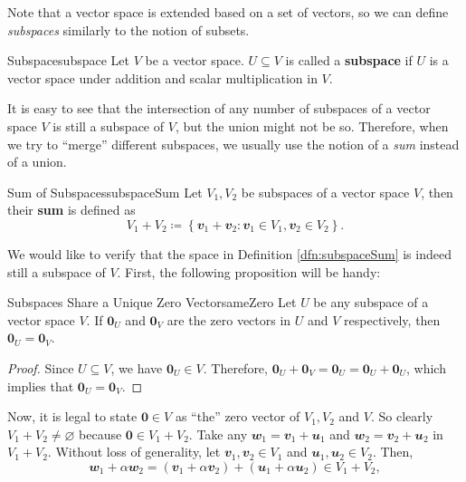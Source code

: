 \documentclass[math]{amznotes}
\theoremstyle{remark}
\newcommand{\zero}{\mathbf{0}}
\begin{document}
Note that a vector space is extended based on a set of vectors, so we can define \textit{subspaces} similarly to the notion of subsets.
\begin{dfnbox}{Subspace}{subspace}
    Let $V$ be a vector space. $U \subseteq V$ is called a {\color{red} \textbf{subspace}} if $U$ is a vector space under addition and scalar multiplication in $V$.
\end{dfnbox}
It is easy to see that the intersection of any number of subspaces of a vector space $V$ is still a subspace of $V$, but the union might not be so. Therefore, when we try to ``merge'' different subspaces, we usually use the notion of a \textit{sum} instead of a union. 
\begin{dfnbox}{Sum of Subspaces}{subspaceSum}
    Let $V_1, V_2$ be subspaces of a vector space $V$, then their {\color{red} \textbf{sum}} is defined as 
    \begin{equation*}
        V_1 + V_2 \coloneqq \left\{\mathbfit{v}_1 + \mathbfit{v}_2 \colon \mathbfit{v}_1 \in V_1, \mathbfit{v}_2 \in V_2\right\}.
    \end{equation*}
\end{dfnbox}
We would like to verify that the space in Definition \ref{dfn:subspaceSum} is indeed still a subspace of $V$. First, the following proposition will be handy:
\begin{probox}{Subspaces Share a Unique Zero Vector}{sameZero}
    Let $U$ be any subspace of a vector space $V$. If $\zero_U$ and $\zero_V$ are the zero vectors in $U$ and $V$ respectively, then $\zero_U = \zero_V$.
    \tcblower
    \begin{proof}
        Since $U \subseteq V$, we have $\zero_U \in V$. Therefore, $\zero_U + \zero_V = \zero_U = \zero_U + \zero_U$, which implies that $\zero_U = \zero_V$.
    \end{proof}
\end{probox} 
Now, it is legal to state $\zero \in V$ as ``the'' zero vector of $V_1, V_2$ and $V$. So clearly $V_1 + V_2 \neq \varnothing$ because $\zero \in V_1 + V_2$. Take any $\mathbfit{w}_1 = \mathbfit{v}_1 + \mathbfit{u}_1$ and $\mathbfit{w}_2 = \mathbfit{v}_2 + \mathbfit{u}_2$ in $V_1 + V_2$. Without loss of generality, let $\mathbfit{v}_1, \mathbfit{v}_2 \in V_1$ and $\mathbfit{u}_1, \mathbfit{u}_2 \in V_2$. Then, 
\begin{equation*}
    \mathbfit{w}_1 + \alpha\mathbfit{w}_2 = (\mathbfit{v}_1 + \alpha\mathbfit{v}_2) + (\mathbfit{u}_1 + \alpha\mathbfit{u}_2) \in V_1 + V_2,
\end{equation*}
\end{document}
